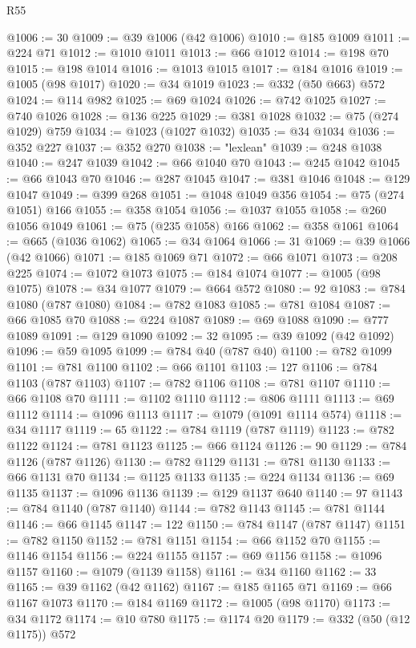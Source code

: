 \begin{lexlean}{R55}
\begin{coremodule}
{{{{{{{{{{{{{{{{{{{{{{{{{{{{{{{{{{{{{{{{{{{{{{{{{{{{{{{{{{{{{{{{{{{{{{{{{{{{{{{{@1006 := 30
@1009 := @39 @1006 (@42 @1006)
@1010 := @185 @1009
@1011 := @224 @71
@1012 := @1010 @1011
@1013 := @66 @1012
@1014 := @198 @70
@1015 := @198 @1014
@1016 := @1013 @1015
@1017 := @184 @1016
@1019 := @1005 (@98 @1017)
@1020 := @34 @1019
@1023 := @332 (@50 @663) @572
@1024 := @114 @982
@1025 := @69 @1024
@1026 := @742 @1025
@1027 := @740 @1026
@1028 := @136 @225
@1029 := @381 @1028
@1032 := @75 (@274 @1029) @759
@1034 := @1023 (@1027 @1032)
@1035 := @34 @1034
@1036 := @352 @227
@1037 := @352 @270
@1038 := "lexlean"
@1039 := @248 @1038
@1040 := @247 @1039
@1042 := @66 @1040 @70
@1043 := @245 @1042
@1045 := @66 @1043 @70
@1046 := @287 @1045
@1047 := @381 @1046
@1048 := @129 @1047
@1049 := @399 @268
@1051 := @1048 @1049 @356
@1054 := @75 (@274 @1051) @166
@1055 := @358 @1054
@1056 := @1037 @1055
@1058 := @260 @1056 @1049
@1061 := @75 (@235 @1058) @166
@1062 := @358 @1061
@1064 := @665 (@1036 @1062)
@1065 := @34 @1064
@1066 := 31
@1069 := @39 @1066 (@42 @1066)
@1071 := @185 @1069 @71
@1072 := @66 @1071
@1073 := @208 @225
@1074 := @1072 @1073
@1075 := @184 @1074
@1077 := @1005 (@98 @1075)
@1078 := @34 @1077
@1079 := @664 @572
@1080 := 92
@1083 := @784 @1080 (@787 @1080)
@1084 := @782 @1083
@1085 := @781 @1084
@1087 := @66 @1085 @70
@1088 := @224 @1087
@1089 := @69 @1088
@1090 := @777 @1089
@1091 := @129 @1090
@1092 := 32
@1095 := @39 @1092 (@42 @1092)
@1096 := @59 @1095
@1099 := @784 @40 (@787 @40)
@1100 := @782 @1099
@1101 := @781 @1100
@1102 := @66 @1101
@1103 := 127
@1106 := @784 @1103 (@787 @1103)
@1107 := @782 @1106
@1108 := @781 @1107
@1110 := @66 @1108 @70
@1111 := @1102 @1110
@1112 := @806 @1111
@1113 := @69 @1112
@1114 := @1096 @1113
@1117 := @1079 (@1091 @1114 @574)
@1118 := @34 @1117
@1119 := 65
@1122 := @784 @1119 (@787 @1119)
@1123 := @782 @1122
@1124 := @781 @1123
@1125 := @66 @1124
@1126 := 90
@1129 := @784 @1126 (@787 @1126)
@1130 := @782 @1129
@1131 := @781 @1130
@1133 := @66 @1131 @70
@1134 := @1125 @1133
@1135 := @224 @1134
@1136 := @69 @1135
@1137 := @1096 @1136
@1139 := @129 @1137 @640
@1140 := 97
@1143 := @784 @1140 (@787 @1140)
@1144 := @782 @1143
@1145 := @781 @1144
@1146 := @66 @1145
@1147 := 122
@1150 := @784 @1147 (@787 @1147)
@1151 := @782 @1150
@1152 := @781 @1151
@1154 := @66 @1152 @70
@1155 := @1146 @1154
@1156 := @224 @1155
@1157 := @69 @1156
@1158 := @1096 @1157
@1160 := @1079 (@1139 @1158)
@1161 := @34 @1160
@1162 := 33
@1165 := @39 @1162 (@42 @1162)
@1167 := @185 @1165 @71
@1169 := @66 @1167 @1073
@1170 := @184 @1169
@1172 := @1005 (@98 @1170)
@1173 := @34 @1172
@1174 := @10 @780
@1175 := @1174 @20
@1179 := @332 (@50 (@12 @1175)) @572
}}}}}}}}}}}}}}}}}}}}}}}}}}}}}}}}}}}}}}}}}}}}}}}}}}}}}}}}}}}}}}}}}}}}}}}}}}}}}}}}
\end{coremodule}
\end{lexlean}
